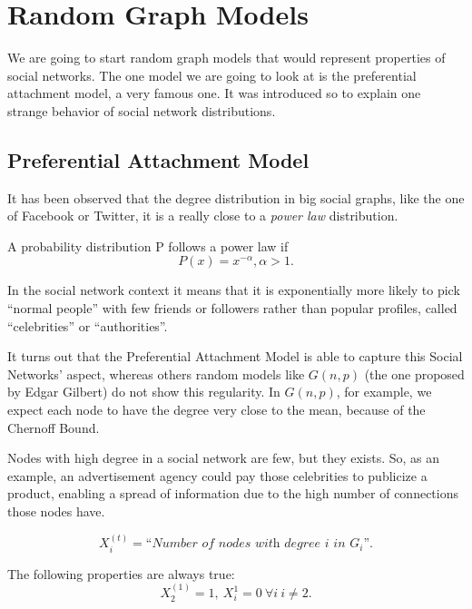 \chapter{Random Graph Models}

We are going to start random graph models that would represent properties of social networks. The one model we are going to look at is the preferential attachment model, a very famous one. It was introduced so to explain one strange behavior of
social network distributions.

\section{Preferential Attachment Model}

It has been observed that the degree distribution in big social graphs, like the one of Facebook or Twitter, it is a really close to a \emph{power law} distribution.

\begin{defn}
	A probability distribution P follows a power law if
	\begin{equation}
		P(x) = x^{-\alpha}, \alpha > 1.
	\end{equation}
\end{defn}

In the social network context it means that it is exponentially more likely to pick ``normal people'' with few friends or followers rather than popular profiles, called ``celebrities'' or ``authorities''.

It turns out that the Preferential Attachment Model is able to capture this Social Networks' aspect, whereas others random models like $G(n,p)$ (the one proposed by Edgar Gilbert) do not show this regularity. In $G(n,p)$, for example, we expect each node to have the degree very close to the mean, because of the Chernoff Bound.

Nodes with high degree in a social network are few, but they exists. So, as an example, an advertisement agency could pay those celebrities to publicize a product, enabling a spread of information due to the high number of connections those nodes have.

\begin{equation}
	X_i^{(t)} = \textit{``Number of nodes with degree $i$ in $G_i$''}.
\end{equation}

The following properties are always true:
\begin{equation}
	X_2^{(1)} = 1,\ X_i^{{1}} = 0\ \forall i\ i \neq 2.
\end{equation}

